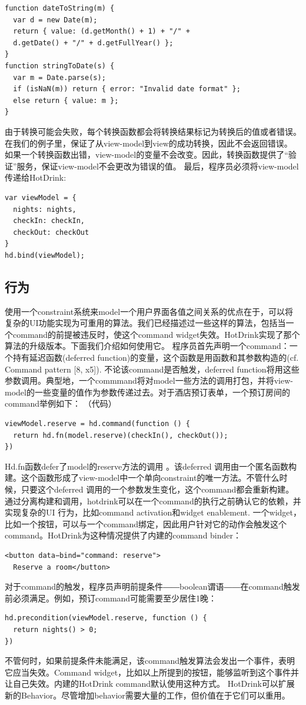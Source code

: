 \begin{verbatim}
function dateToString(m) {
  var d = new Date(m);
  return { value: (d.getMonth() + 1) + "/" +
  d.getDate() + "/" + d.getFullYear() };
}
function stringToDate(s) {
  var m = Date.parse(s);
  if (isNaN(m)) return { error: "Invalid date format" };
  else return { value: m };
}
\end{verbatim}
由于转换可能会失败，每个转换函数都会将转换结果标记为转换后的值或者错误。在我们的例子里，保证了从view-model到view的成功转换，因此不会返回错误。
如果一个转换函数出错，view-model的变量不会改变。因此，转换函数提供了“验证”服务，保证view-model不会更改为错误的值。
最后，程序员必须将view-model传递给HotDrink:
\begin{verbatim}
var viewModel = {
  nights: nights,
  checkIn: checkIn,
  checkOut: checkOut
}
hd.bind(viewModel);
\end{verbatim}

\subsection*{行为}
使用一个constraint系统来model一个用户界面各值之间关系的优点在于，可以将复杂的UI功能实现为可重用的算法。我们已经描述过一些这样的算法，包括当一个command的前提被违反时，使这个command widget失效。HotDrink实现了那个算法的升级版本。下面我们介绍如何使用它。
程序员首先声明一个command：一个持有延迟函数(deferred function)的变量，这个函数是用函数和其参数构造的(cf. Command pattern [8, x5]). 不论该command是否触发，deferred function将用这些参数调用。典型地，一个commmand将对model一些方法的调用打包，并将view-model的一些变量的值作为参数传递过去。对于酒店预订表单，一个预订房间的command举例如下：
（代码）
\begin{verbatim}
viewModel.reserve = hd.command(function () {
  return hd.fn(model.reserve)(checkIn(), checkOut());
})
\end{verbatim}
Hd.fn函数defer了model的reserve方法的调用 。该deferred 调用由一个匿名函数构建。这个函数形成了view-model中一个单向constraint的唯一方法。不管什么时候，只要这个deferred 调用的一个参数发生变化，这个command都会重新构建。通过分离构建和调用，hotdrink可以在一个command的执行之前确认它的依赖，并实现复杂的UI 行为，比如command activation和widget enablement.
一个widget，比如一个按钮，可以与一个command绑定，因此用户针对它的动作会触发这个command。HotDrink为这种情况提供了内建的command binder：
\begin{verbatim}
<button data−bind="command: reserve"> 
  Reserve a room</button> 
\end{verbatim}
对于command的触发，程序员声明前提条件――boolean谓语――在command触发前必须满足。例如，预订command可能需要至少居住1晚：
\begin{verbatim}
hd.precondition(viewModel.reserve, function () { 
  return nights() > 0; 
}) 
\end{verbatim}
不管何时，如果前提条件未能满足，该command触发算法会发出一个事件，表明它应当失效。Command widget，比如以上所提到的按钮，能够监听到这个事件并让自己失效。内建的HotDrink command默认使用这种方式。
HotDrink可以扩展新的Behavior。尽管增加behavior需要大量的工作，但价值在于它们可以重用。
